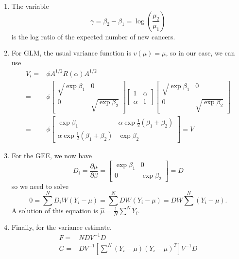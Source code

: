 \documentclass{article}
\begin{document}
\begin{enumerate}
\begin{enumerate}
  \item The variable
    \[
      \gamma = \beta_2 - \beta_1 = \log(\frac{\mu_2}{\mu_1})
    \]
    is the log ratio of the expected number of new cancers.
  \item For GLM, the usual variance function is $v(\mu) = \mu$, so in
    our case, we can use
    \begin{align*}
      V_i = & \phi A^{1/2} R(\alpha) A^{1/2} \\
      = & \phi
          \begin{bmatrix}
            \sqrt{\exp \beta_1} & 0 \\
            0 & \sqrt{\exp \beta_2}
          \end{bmatrix}
                \begin{bmatrix}
                  1 & \alpha \\
                  \alpha & 1
                \end{bmatrix}
                           \begin{bmatrix}
                             \sqrt{\exp \beta_1} & 0 \\
                             0 & \sqrt{\exp \beta_2}
                           \end{bmatrix}
      \\ = & \phi
             \begin{bmatrix}
               \exp \beta_1 & \alpha \exp\frac{1}{2}(\beta_1 + \beta_2)\\
               \alpha \exp\frac{1}{2}(\beta_1 + \beta_2) & \exp
               \beta_2
             \end{bmatrix} = V
    \end{align*}
  \item For the GEE, we now have
    \[
      D_i = \frac{\partial \mu}{\partial \beta} =
      \begin{bmatrix}
        \exp \beta_1 & 0 \\
        0 & \exp \beta_2
      \end{bmatrix}
      = D
    \]
    so we need to solve
    \[
      0 = \sum^N D_i W (Y_i - \mu) = \sum^N D W (Y_i - \mu) = D W
      \sum^N (Y_i - \mu).
    \]
    A solution of this equation is $\hat{\mu} = \frac{1}{N} \sum^N Y_i$.
  \item Finally, for the variance estimate,
    \begin{align*}
      F = & NDV^{-1}D \\
      G = & D V^{-1} [\sum^N (Y_i - \mu) (Y_i - \mu)^T] V^{-1} D
    \end{align*}

\end{enumerate}
\end{enumerate}
\end{document}
